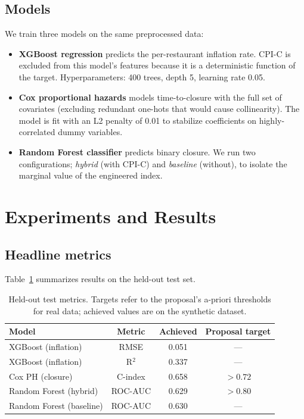 \documentclass{article}
\begin{document}
\subsection{Models}
We train three models on the same preprocessed data:
\begin{itemize}
\item \textbf{XGBoost regression} predicts the per-restaurant inflation rate. CPI-C is excluded from this model's features because it is a deterministic function of the target. Hyperparameters: 400 trees, depth 5, learning rate 0.05.
\item \textbf{Cox proportional hazards} models time-to-closure with the full set of covariates (excluding redundant one-hots that would cause collinearity). The model is fit with an L2 penalty of 0.01 to stabilize coefficients on highly-correlated dummy variables.
\item \textbf{Random Forest classifier} predicts binary closure. We run two configurations; \emph{hybrid} (with CPI-C) and \emph{baseline} (without), to isolate the marginal value of the engineered index.
\end{itemize}

\section{Experiments and Results}

\subsection{Headline metrics}
Table~\ref{tab:metrics} summarizes results on the held-out test set.

\begin{table}[h]
\centering
\caption{Held-out test metrics. Targets refer to the proposal's a-priori thresholds for real data; achieved values are on the synthetic dataset.}
\label{tab:metrics}
\begin{tabular}{lccc}
\toprule
Model & Metric & Achieved & Proposal target \\
\midrule
XGBoost (inflation) & RMSE & 0.051 & --- \\
XGBoost (inflation) & R$^2$ & 0.337 & --- \\
Cox PH (closure) & C-index & 0.658 & $>0.72$ \\
Random Forest (hybrid) & ROC-AUC & 0.629 & $>0.80$ \\
Random Forest (baseline) & ROC-AUC & 0.630 & --- \\
\bottomrule
\end{tabular}
\end{table}
\end{document}
